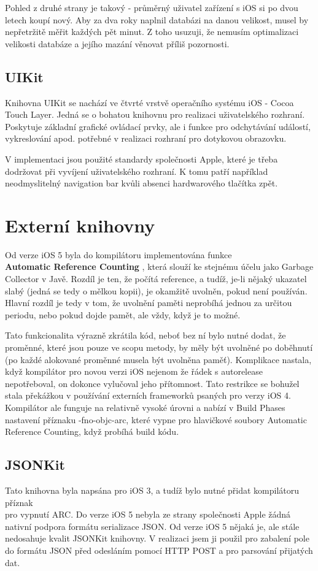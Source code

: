 Pohled z druhé strany je takový - průměrný uživatel zařízení s iOS si po dvou letech koupí nový. Aby za dva roky naplnil databázi na danou velikost, musel by nepřetržitě měřit každých pět minut. Z toho usuzuji, že nemusím optimalizaci velikosti databáze a jejího mazání věnovat příliš pozornosti.

\newpage

\subsection{UIKit}
Knihovna UIKit se nachází ve čtvrté vrstvě operačního systému iOS - Cocoa Touch Layer. Jedná se o bohatou knihovnu pro realizaci uživatelského rozhraní. Poskytuje základní grafické ovládací prvky, ale i funkce pro odchytávání událostí, vykreslování apod. potřebné v realizaci rozhraní pro dotykovou obrazovku.

V implementaci jsou použité standardy společnosti Apple, které je třeba dodržovat při vyvíjení uživatelského rozhraní. K tomu patří například neodmyslitelný navigation bar kvůli absenci hardwarového tlačítka zpět.

\section{Externí knihovny} 
Od verze iOS 5 byla do kompilátoru implementována funkce \\{\bf Automatic Reference Counting} \cite{ARC}, která slouží ke stejnému účelu jako Garbage Collector v Javě. Rozdíl je ten, že počítá reference, a tudíž, je-li nějaký ukazatel slabý (jedná se tedy o mělkou kopii), je okamžitě uvolněn, pokud není používán. Hlavní rozdíl je tedy v tom, že uvolnění paměti neprobíhá jednou za určitou periodu, nebo pokud dojde pamět, ale vždy, když je to možné.

Tato funkcionalita výrazně zkrátila kód, neboť bez ní bylo nutné dodat, že proměnné, které jsou pouze ve scopu metody, by měly být uvolněné po doběhnutí (po každé alokované proměnné musela být uvolněna paměť). Komplikace nastala, když kompilátor pro novou verzi iOS nejenom že řádek s autorelease nepotřeboval, on dokonce vylučoval jeho přítomnost. Tato restrikce se bohužel stala překážkou v používání externích frameworků psaných pro verzy iOS 4. Kompilátor ale funguje na relativně vysoké úrovni a nabízí v Build Phases nastavení příznaku -fno-objc-arc, které vypne pro hlavičkové soubory Automatic Reference Counting, když probíhá build kódu.

\subsection{JSONKit}
Tato knihovna byla napsána pro iOS 3, a tudíž bylo nutné přidat kompilátoru příznak \\pro vypnutí ARC. Do verze iOS 5 nebyla ze strany společnosti Apple žádná nativní podpora formátu serializace JSON. Od verze iOS 5 nějaká je, ale stále nedosahuje kvalit JSONKit knihovny. V realizaci jsem ji použil pro zabalení pole do formátu JSON před odesláním pomocí HTTP POST a pro parsování přijatých dat.

